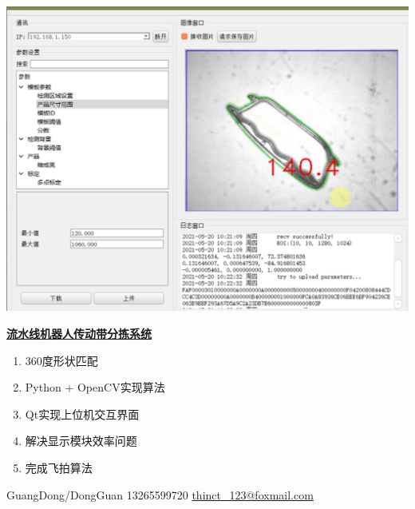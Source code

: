 \documentclass[lighthipster]{simplehipstercv}
\begin{document}
\begin{minipage}[t]{\textwidth}
		\begin{minipage}[t]{\textwidth}
		\begin{minipage}[thbp]{0.3\textwidth}
			\includegraphics[width=\linewidth]{PrjMy_3.png}
		\end{minipage} \hfill
		\begin{minipage}[thbp!]{0.6\textwidth}
			\textbf{\underline{流水线机器人传动带分拣系统}}
			\begin{enumerate}
				\item 360度形状匹配
				\item Python + OpenCV实现算法
				\item Qt实现上位机交互界面
				\item 解决显示模块效率问题
				\item 完成飞拍算法
			\end{enumerate}
		\end{minipage}
		\bigskip
		\end{minipage}
		
		\bigskip
	\end{minipage}
	
	
	
	\vspace{12em}
	
	\vfill{} %
	
	\setlength{\parindent}{0pt}
	\begin{minipage}[t]{\linewidth}
		\begin{flushright}\fontfamily{\sfdefault}\selectfont \color{black!70}
			{ GuangDong/DongGuan  13265599720  \protect\url{thinct_123@foxmail.com}
			}
		\end{flushright}
	\end{minipage}
	
\end{document}
